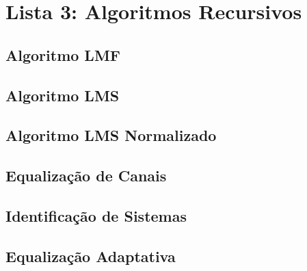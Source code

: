 \section{Lista 3: Algoritmos Recursivos}

\subsection{Algoritmo LMF}

\subsection{Algoritmo LMS}

\subsection{Algoritmo LMS Normalizado}

\subsection{Equalização de Canais}

\subsection{Identificação de Sistemas}

\subsection{Equalização Adaptativa}
